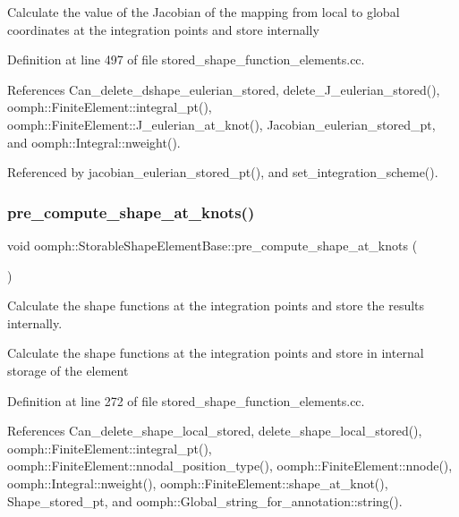 Calculate the value of the Jacobian of the mapping from local to global coordinates at the integration points and store internally 

Definition at line 497 of file stored\+\_\+shape\+\_\+function\+\_\+elements.\+cc.



References Can\+\_\+delete\+\_\+dshape\+\_\+eulerian\+\_\+stored, delete\+\_\+\+J\+\_\+eulerian\+\_\+stored(), oomph\+::\+Finite\+Element\+::integral\+\_\+pt(), oomph\+::\+Finite\+Element\+::\+J\+\_\+eulerian\+\_\+at\+\_\+knot(), Jacobian\+\_\+eulerian\+\_\+stored\+\_\+pt, and oomph\+::\+Integral\+::nweight().



Referenced by jacobian\+\_\+eulerian\+\_\+stored\+\_\+pt(), and set\+\_\+integration\+\_\+scheme().

\mbox{\label{classoomph_1_1StorableShapeElementBase_ad6900d26b449b3c58cba23bb58c631a7}} 
\subsubsection{\texorpdfstring{pre\+\_\+compute\+\_\+shape\+\_\+at\+\_\+knots()}{pre\_compute\_shape\_at\_knots()}}
{\footnotesize\ttfamily void oomph\+::\+Storable\+Shape\+Element\+Base\+::pre\+\_\+compute\+\_\+shape\+\_\+at\+\_\+knots (\begin{DoxyParamCaption}{ }\end{DoxyParamCaption})}



Calculate the shape functions at the integration points and store the results internally. 

Calculate the shape functions at the integration points and store in internal storage of the element 

Definition at line 272 of file stored\+\_\+shape\+\_\+function\+\_\+elements.\+cc.



References Can\+\_\+delete\+\_\+shape\+\_\+local\+\_\+stored, delete\+\_\+shape\+\_\+local\+\_\+stored(), oomph\+::\+Finite\+Element\+::integral\+\_\+pt(), oomph\+::\+Finite\+Element\+::nnodal\+\_\+position\+\_\+type(), oomph\+::\+Finite\+Element\+::nnode(), oomph\+::\+Integral\+::nweight(), oomph\+::\+Finite\+Element\+::shape\+\_\+at\+\_\+knot(), Shape\+\_\+stored\+\_\+pt, and oomph\+::\+Global\+\_\+string\+\_\+for\+\_\+annotation\+::string().



